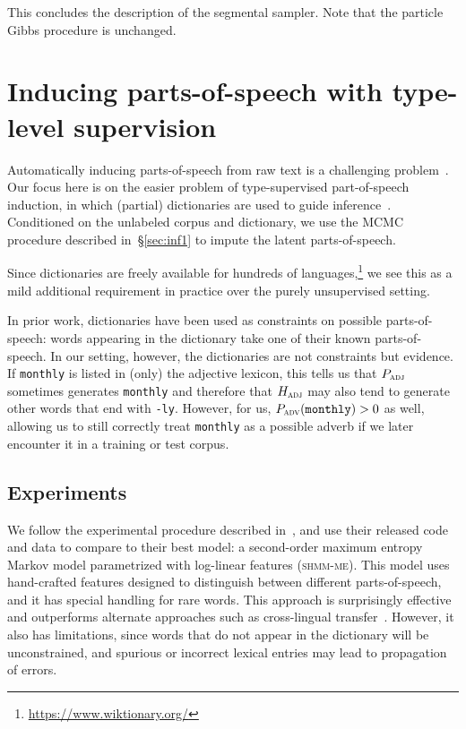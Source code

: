 \documentclass[11pt]{article}
\begin{document}
This concludes the description of the segmental sampler. Note that the particle Gibbs procedure is unchanged.

\section{Inducing parts-of-speech with type-level supervision}\label{sec:pos}

Automatically inducing parts-of-speech from raw text is a challenging
problem~\cite{goldwater2005}. Our focus here is on the easier problem
of type-supervised part-of-speech induction, in which (partial)
dictionaries are used to guide
inference~\cite{garrette2012,li2012wiki}. Conditioned on the unlabeled corpus and dictionary, we use the MCMC procedure described in~\S\ref{sec:inf1} to impute the latent parts-of-speech.

Since dictionaries are freely available for hundreds of
languages,\footnote{\url{https://www.wiktionary.org/}} we see this as a mild additional requirement in practice over the
purely unsupervised setting.

In prior work, dictionaries have
been used as constraints on possible parts-of-speech: words appearing
in the dictionary take one of their known parts-of-speech.  In our setting, however, the dictionaries are not constraints but evidence.  If \texttt{monthly} is listed in (only) the adjective lexicon, this tells us that $P_{\textsc{adj}}$ sometimes generates \texttt{monthly} and therefore that $H_{\textsc{adj}}$ may also tend to generate other words that end with \texttt{-ly}.  However, for us, $P_{\textsc{adv}}(\texttt{monthly}) > 0$ as well, allowing us to still correctly treat \texttt{monthly} as a possible adverb if we later encounter it in a training or test corpus.

\subsection{Experiments}\label{sec:posexpts}

We follow the experimental procedure described in~, and use their released code and data to compare to their best model: a second-order maximum entropy Markov model
parametrized with log-linear features (\textsc{shmm-me}).  This
model uses hand-crafted features designed to distinguish between
different parts-of-speech, and it has special handling for rare words.
This approach is surprisingly effective and outperforms alternate
approaches such as cross-lingual transfer~\cite{das2011}. However, it
also has limitations, since words that do not appear in the dictionary will be unconstrained, and spurious or incorrect lexical entries may lead to propagation of errors.
\end{document}
